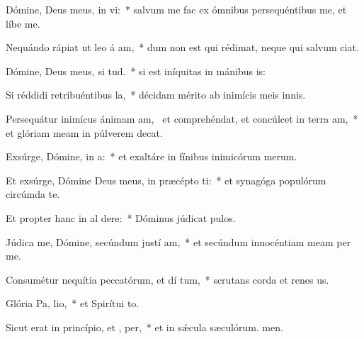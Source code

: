 \item Dómine, Deus meus, in  vi:~* salvum me fac ex ómnibus persequéntibus me, et líbe me.
\item Nequándo rápiat ut leo á am,~* dum non est qui rédimat, neque qui salvum ciat.
\item Dómine, Deus meus, si  tud.~* si est iníquitas in mánibus is:
\item Si réddidi retribuéntibus  la,~* décidam mérito ab inimícis meis innis.
\item Persequátur inimícus ánimam am,~\pscross{} et comprehéndat, et concúlcet in terra  am,~* et glóriam meam in púlverem decat.
\item Exsúrge, Dómine, in  a:~* et exaltáre in fínibus inimicórum merum.
\item Et exsúrge, Dómine Deus meus, in præcépto  ti:~* et synagóga populórum circúmda te.
\item Et propter hanc in al dere:~* Dóminus júdicat pulos.
\item Júdica me, Dómine, secúndum justí am,~* et secúndum innocéntiam meam per me.
\item Consumétur nequítia peccatórum, et dí tum,~* scrutans corda et renes us.
\item Glória Pa,  lio,~* et Spirítui to.
\item Sicut erat in princípio, et ,  per,~* et in sǽcula sæculórum. men.
